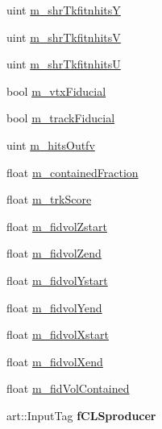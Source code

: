 \begin{DoxyCompactItemize}
\item 
uint \hyperlink{classselection_1_1CCincSelection_a63f55e51e3df0e108aace93b3c34c153}{m\+\_\+shr\+TkfitnhitsY}
\item 
uint \hyperlink{classselection_1_1CCincSelection_a8ad70697906b08285a218c739e8c4815}{m\+\_\+shr\+TkfitnhitsV}
\item 
uint \hyperlink{classselection_1_1CCincSelection_a3617f2e35ecc3cd9ceb53108b4c288cb}{m\+\_\+shr\+TkfitnhitsU}
\item 
bool \hyperlink{classselection_1_1CCincSelection_a0f08b768b994a2b2798a54a1b11cfaef}{m\+\_\+vtx\+Fiducial}
\item 
bool \hyperlink{classselection_1_1CCincSelection_a7f2d544a3260377cab6db80b8bf81302}{m\+\_\+track\+Fiducial}
\item 
uint \hyperlink{classselection_1_1CCincSelection_ac839d87e0a429876df355fee2a561e60}{m\+\_\+hits\+Outfv}
\item 
float \hyperlink{classselection_1_1CCincSelection_a5ac3c52c6a88691182c3b3c6594d9744}{m\+\_\+contained\+Fraction}
\item 
float \hyperlink{classselection_1_1CCincSelection_a2c3b80516e3731ec9b4f5ccbee6864ba}{m\+\_\+trk\+Score}
\item 
float \hyperlink{classselection_1_1CCincSelection_a291cc5986c0861bf1883ec1c41457afd}{m\+\_\+fidvol\+Zstart}
\item 
float \hyperlink{classselection_1_1CCincSelection_a2510a29ed7584b2d56eb8dff636ceee6}{m\+\_\+fidvol\+Zend}
\item 
float \hyperlink{classselection_1_1CCincSelection_a28900415eda1eb30d6263081e943e6a5}{m\+\_\+fidvol\+Ystart}
\item 
float \hyperlink{classselection_1_1CCincSelection_a01d6a0608356e4ea245f23e1b6934fd3}{m\+\_\+fidvol\+Yend}
\item 
float \hyperlink{classselection_1_1CCincSelection_aab38faac4866d19339aadbc3ac1eb55b}{m\+\_\+fidvol\+Xstart}
\item 
float \hyperlink{classselection_1_1CCincSelection_ae4bab4cf8ea55e54fcdaa66d2fe44c1d}{m\+\_\+fidvol\+Xend}
\item 
float \hyperlink{classselection_1_1CCincSelection_a3412d86b03a97a65fed3d5d8a41ed2c0}{m\+\_\+fid\+Vol\+Contained}
\item 
art\+::\+Input\+Tag {\bfseries f\+C\+L\+Sproducer}\hypertarget{classselection_1_1CCincSelection_aa068a963cfe008cf151aaf36ac1be0cb}{}\label{classselection_1_1CCincSelection_aa068a963cfe008cf151aaf36ac1be0cb}


\end{DoxyCompactItemize}
